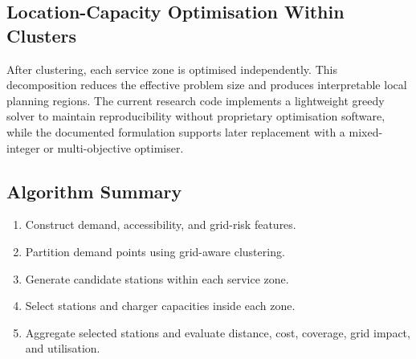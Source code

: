 \subsection{Location-Capacity Optimisation Within Clusters}
After clustering, each service zone is optimised independently. This decomposition reduces the effective problem size and produces interpretable local planning regions. The current research code implements a lightweight greedy solver to maintain reproducibility without proprietary optimisation software, while the documented formulation supports later replacement with a mixed-integer or multi-objective optimiser.

\subsection{Algorithm Summary}
\begin{enumerate}
  \item Construct demand, accessibility, and grid-risk features.
  \item Partition demand points using grid-aware clustering.
  \item Generate candidate stations within each service zone.
  \item Select stations and charger capacities inside each zone.
  \item Aggregate selected stations and evaluate distance, cost, coverage, grid impact, and utilisation.
\end{enumerate}

